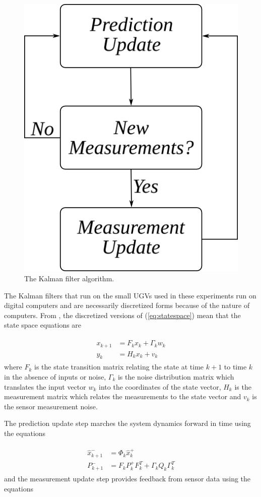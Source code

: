 \begin{figure}[ht!]
	\centering
	\includegraphics[width=.4\textwidth]{images/kf}
	\caption{The Kalman filter algorithm.}
	\label{fig:kf}
\end{figure}

The Kalman filters that run on the small UGVs used in these experiments run on digital computers and are necessarily discretized forms because of the nature of computers. From \cite{Kelly_1994_338}, \cite{Simon06OptimalEstimation} the discretized versions of (\ref{eq:statespace}) mean that the state space equations are

\begin{align}
\label{eq:kfstatemodel}
\begin{split}
x_{k+1} &= F_kx_k + \Gamma_kw_k \\
y_k &= H_kx_k + v_k
\end{split}
\end{align}
where $F_k$ is the state transition matrix relating the state at time $k+1$ to time $k$ in the absence of inputs or noise, $\Gamma_k$ is the noise distribution matrix which translates the input vector $w_k$ into the coordinates of the state vector, $H_k$ is the measurement matrix which relates the measurements to the state vector and $v_k$ is the sensor measurement noise.

The prediction update step marches the system dynamics forward in time using the equations

\begin{align}
\label{eq:kfpredictionupdate}
\begin{split}
\hat{x}_{k+1}^- &= \Phi_k\hat{x}_k^+ \\
P_{k+1}^- &= F_kP_k^+F_k^T + \Gamma_kQ_k\Gamma_k^T
\end{split}
\end{align}
and the measurement update step provides feedback from sensor data using the equations

